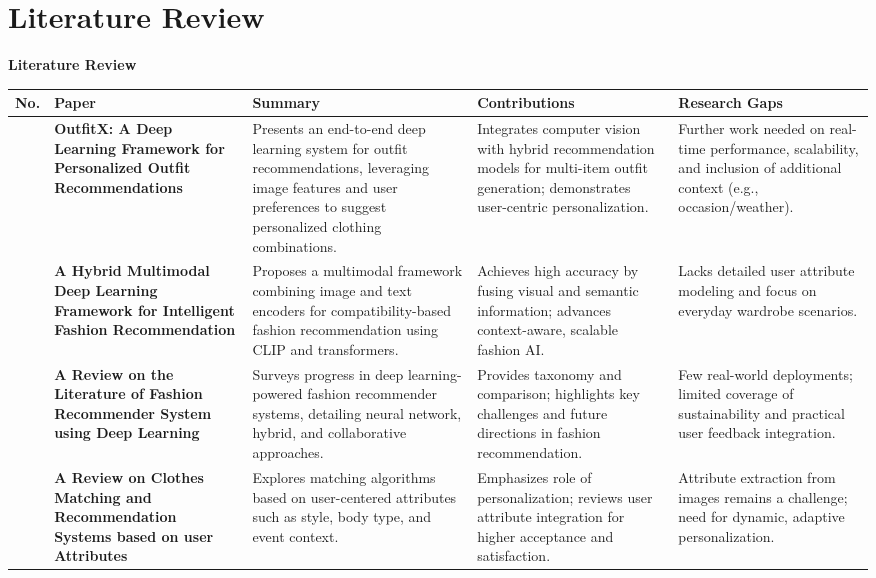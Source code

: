 \documentclass[11pt,aspectratio=169,notes,mathserif]{beamer}
\begin{document}
\section{Literature Review}
\begin{frame}[allowframebreaks]{\textbf{Literature Review}}
\tiny
\begin{table}
	\centering
	\begin{tabular}{|>{\centering\arraybackslash}p{0.5cm}|p{3cm}|p{3.5cm}|p{2.5cm}|p{2.5cm}|}
		\hline
		\textbf{No.} & \textbf{Paper} & \textbf{Summary} & \textbf{Contributions} & \textbf{Research Gaps} \\
		\hline
		1 & \textbf{OutfitX: A Deep Learning Framework for Personalized Outfit Recommendations} & Presents an end-to-end deep learning system for outfit recommendations, leveraging image features and user preferences to suggest personalized clothing combinations. & Integrates computer vision with hybrid recommendation models for multi-item outfit generation; demonstrates user-centric personalization. & Further work needed on real-time performance, scalability, and inclusion of additional context (e.g., occasion/weather). \\
		\hline
		2 & \textbf{A Hybrid Multimodal Deep Learning Framework for Intelligent Fashion Recommendation} & Proposes a multimodal framework combining image and text encoders for compatibility-based fashion recommendation using CLIP and transformers. & Achieves high accuracy by fusing visual and semantic information; advances context-aware, scalable fashion AI. & Lacks detailed user attribute modeling and focus on everyday wardrobe scenarios. \\
		\hline
		3 & \textbf{A Review on the Literature of Fashion Recommender System using Deep Learning} & Surveys progress in deep learning-powered fashion recommender systems, detailing neural network, hybrid, and collaborative approaches. & Provides taxonomy and comparison; highlights key challenges and future directions in fashion recommendation. & Few real-world deployments; limited coverage of sustainability and practical user feedback integration. \\
		\hline
		4 & \textbf{A Review on Clothes Matching and Recommendation Systems based on user Attributes} & Explores matching algorithms based on user-centered attributes such as style, body type, and event context. & Emphasizes role of personalization; reviews user attribute integration for higher acceptance and satisfaction. & Attribute extraction from images remains a challenge; need for dynamic, adaptive personalization. \\
		\hline
	\end{tabular}
\end{table}
\end{frame}
\end{document}
